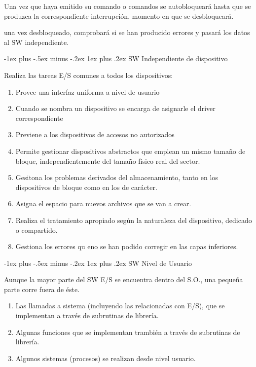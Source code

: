 \documentclass[10pt,portrait, twocolumn]{article}
\makeatletter
\renewcommand{\subsubsection}{\@startsection{subsubsection}{3}{0mm}%
                                {-1ex plus -.5ex minus -.2ex}%
                                {1ex plus .2ex}%
                                {\normalfont\small\bfseries}}
\makeatother
\begin{document}
\quad Una vez que haya emitido su comando o comandos se autobloqueará hasta que se produzca la correspondiente interrupción, momento en que se desbloqueará.

\quad una vez desbloqueado, comprobará si se han producido errores y pasará los datos al SW independiente.

\subsubsection{SW Independiente de dispositivo}

Realiza las tareas E/S comunes a todos los dispositivos:

	\begin{enumerate}
	\item Provee una interfaz uniforma a nivel de usuario
	\item Cuando se nombra un dispositivo se encarga de asignarle el driver correspondiente
	\item Previene a los dispositivos de accesos no autorizados
	\item Permite gestionar dispositivos abstractos que emplean un mismo tamaño de bloque, independientemente del tamaño físico real del sector.
	\item Gesitona los problemas derivados del almacenamiento, tanto en los dispositivos de bloque como en los de carácter.
	\item Asigna el espacio para nuevos archivos que se van a crear.
	\item Realiza el tratamiento apropiado según la naturaleza del dispositivo, dedicado o compartido.
	\item Gestiona los errores qu eno se han podido corregir en las capas inferiores.
	\end{enumerate}
	
\subsubsection{SW Nivel de Usuario}

Aunque la mayor parte del SW E/S se encuentra dentro del S.O., una pequeña parte corre fuera de éste.

	\begin{enumerate}
	\item Las llamadas a sistema (incluyendo las relacionadas con E/S), que se implementan a través de subrutinas de librería.
	\item Algunas funciones que se implementan trambién a través de subrutinas de librería.
	\item Algunos sistemas (procesos) se realizan desde nivel usuario.
	\end{enumerate}
	
\end{document}
